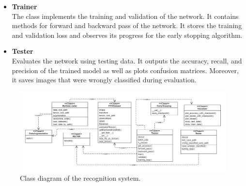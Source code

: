 \begin{itemize}
    \item \textbf{Trainer} \\
    The class implements the training and validation of the network. It contains methods for forward and backward pass of the network. It stores the training and validation loss and observes its progress for the early stopping algorithm. 
    
    \item \textbf{Tester} \\
    Evaluates the network using testing data. It outputs the accuracy, recall, and precision of the trained model as well as plots confusion matrices. Moreover, it saves images that were wrongly classified during evaluation. 
\end{itemize}

\begin{figure}[h]
    \centering
    \includegraphics[width=\textwidth]{images/classDiagramNetwork.png}
    \caption{Class diagram of the recognition system.}
    \label{img:networkClass}
\end{figure}
